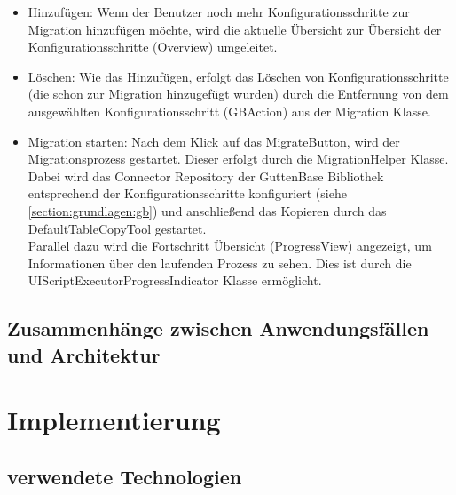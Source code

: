 \begin{itemize}
	\item Hinzufügen: Wenn der Benutzer noch mehr Konfigurationsschritte zur Migration hinzufügen möchte, wird die aktuelle Übersicht zur Übersicht der Konfigurationsschritte (Overview) umgeleitet.
	\item Löschen: Wie das Hinzufügen, erfolgt das Löschen von Konfigurationsschritte (die schon zur Migration hinzugefügt wurden) durch die Entfernung von dem ausgewählten Konfigurationsschritt (GBAction) aus der Migration Klasse. 
	\item Migration starten: Nach dem Klick auf das \glqq Migrate\grqq Button, wird der Migrationsprozess gestartet. Dieser erfolgt durch die MigrationHelper Klasse. Dabei wird das Connector Repository der GuttenBase Bibliothek entsprechend der Konfigurationsschritte konfiguriert (siehe \ref{section:grundlagen:gb}) und anschließend das Kopieren durch das DefaultTableCopyTool gestartet. \\
	Parallel dazu wird die Fortschritt Übersicht (ProgressView) angezeigt, um Informationen über den laufenden Prozess zu sehen. Dies ist durch die UIScriptExecutorProgressIndicator Klasse ermöglicht.
	
\end{itemize}

%
\subsection{Zusammenhänge zwischen Anwendungsfällen und Architektur}


\section{Implementierung}
\subsection{verwendete Technologien}




